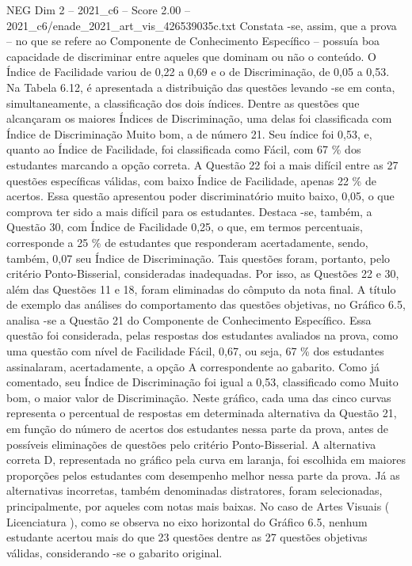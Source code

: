 \begin{textsample}{NEG Dim 2 – 2021\_c6 – Score 2.00 – 2021\_c6/enade\_2021\_art\_vis\_426539035c.txt}
Constata -se, assim, que a prova – no que se refere ao Componente de Conhecimento Específico – possuía boa capacidade de discriminar entre aqueles que dominam ou não o conteúdo.
O Índice de Facilidade variou de 0,22 a 0,69 e o de Discriminação, de 0,05 a 0,53.
Na Tabela 6.12, é apresentada a distribuição das questões levando -se em conta, simultaneamente, a classificação dos dois índices.
Dentre as questões que alcançaram os maiores Índices de Discriminação, uma delas foi classificada com Índice de Discriminação Muito bom, a de número 21.
Seu índice foi 0,53, e, quanto ao Índice de Facilidade, foi classificada como Fácil, com 67 \% dos estudantes marcando a opção correta.
A Questão 22 foi a mais difícil entre as 27 questões específicas válidas, com baixo Índice de Facilidade, apenas 22 \% de acertos.
Essa questão apresentou poder discriminatório muito baixo, 0,05, o que comprova ter sido a mais difícil para os estudantes.
Destaca -se, também, a Questão 30, com Índice de Facilidade 0,25, o que, em termos percentuais, corresponde a 25 \% de estudantes que responderam acertadamente, sendo, também, 0,07 seu Índice de Discriminação.
Tais questões foram, portanto, pelo critério Ponto-Bisserial, consideradas inadequadas.
Por isso, as Questões 22 e 30, além das Questões 11 e 18, foram eliminadas do cômputo da nota final.
A título de exemplo das análises do comportamento das questões objetivas, no Gráfico 6.5, analisa -se a Questão 21 do Componente de Conhecimento Específico.
Essa questão foi considerada, pelas respostas dos estudantes avaliados na prova, como uma questão com nível de Facilidade Fácil, 0,67, ou seja, 67 \% dos estudantes assinalaram, acertadamente, a opção A correspondente ao gabarito.
Como já comentado, seu Índice de Discriminação foi igual a 0,53, classificado como Muito bom, o maior valor de Discriminação.
Neste gráfico, cada uma das cinco curvas representa o percentual de respostas em determinada alternativa da Questão 21, em função do número de acertos dos estudantes nessa parte da prova, antes de possíveis eliminações de questões pelo critério Ponto-Bisserial.
A alternativa correta D, representada no gráfico pela curva em laranja, foi escolhida em maiores proporções pelos estudantes com desempenho melhor nessa parte da prova.
Já as alternativas incorretas, também denominadas distratores, foram selecionadas, principalmente, por aqueles com notas mais baixas.
No caso de Artes Visuais ( Licenciatura ), como se observa no eixo horizontal do Gráfico 6.5, nenhum estudante acertou mais do que 23 questões dentre as 27 questões objetivas válidas, considerando -se o gabarito original.

\end{textsample}
